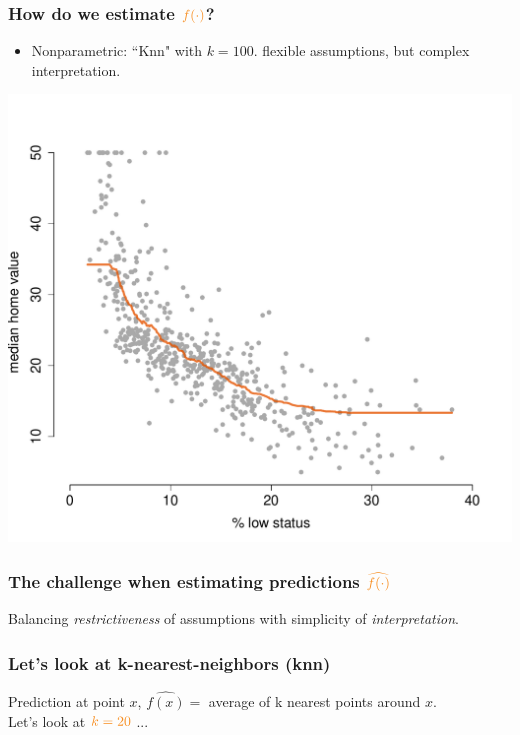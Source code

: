 \documentclass{beamer}
\newcommand{\bo}[1]{\textcolor{burntorange}{#1}}
\begin{document}
\begin{frame}[plain]
\frametitle{How do we estimate $\bo{f(\cdot)}$?}
\vspace{5mm}
\begin{itemize}
\item[] Nonparametric: ``Knn" with $k=100$. \bo{flexible assumptions, but complex interpretation}.
\end{itemize}
\vspace{-9mm}
\begin{center}
\includegraphics[scale=.39]{DaveBostonplot3.pdf}
\end{center}


\end{frame}


\begin{frame}[plain]
\frametitle{The challenge when estimating predictions $\bo{\widehat{f(\cdot)}}$}
\vspace{5mm}
Balancing \bo{\textit{restrictiveness}} of assumptions with simplicity of \bo{\textit{interpretation}}.

\end{frame}

\begin{frame}[plain]
\frametitle{Let's look at k-nearest-neighbors (knn)}
\vspace{5mm}
	Prediction at point $x$, $\widehat{f(x)} =$ average of k nearest points around $x$. \\ \vspace{9mm}\pause
Let's look at $\bo{k=20}$ ...
\end{frame}
\end{document}
